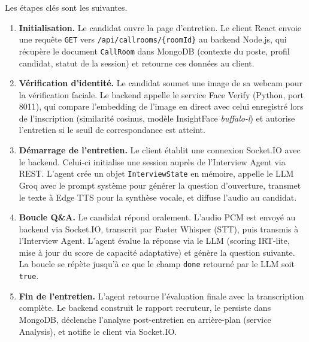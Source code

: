 Les étapes clés sont les suivantes.

\begin{sloppypar}
\begin{enumerate}
  \item \textbf{Initialisation.} Le candidat ouvre la page d'entretien. Le client React envoie
        une requête \texttt{GET} vers \texttt{/api/callrooms/\{roomId\}} au backend Node.js,
        qui récupère le document \texttt{CallRoom} dans MongoDB (contexte du poste, profil
        candidat, statut de la session) et retourne ces données au client.

  \item \textbf{Vérification d'identité.} Le candidat soumet une image de sa webcam pour
        la vérification faciale. Le backend appelle le service Face Verify (Python, port 8011),
        qui compare l'embedding de l'image en direct avec celui enregistré lors de l'inscription
        (similarité cosinus, modèle InsightFace \textit{buffalo-l}) et autorise l'entretien
        si le seuil de correspondance est atteint.

  \item \textbf{Démarrage de l'entretien.} Le client établit une connexion Socket.IO avec le
        backend. Celui-ci initialise une session auprès de l'Interview Agent via REST. L'agent
        crée un objet \texttt{InterviewState} en mémoire, appelle le LLM Groq avec le prompt
        système pour générer la question d'ouverture, transmet le texte à Edge TTS pour la
        synthèse vocale, et diffuse l'audio au candidat.

  \item \textbf{Boucle Q\&A.} Le candidat répond oralement. L'audio PCM est envoyé au backend
        via Socket.IO, transcrit par Faster Whisper (STT), puis transmis à l'Interview Agent.
        L'agent évalue la réponse via le LLM (scoring IRT-lite, mise à jour du score de
        capacité adaptative) et génère la question suivante. La boucle se répète jusqu'à ce
        que le champ \texttt{done} retourné par le LLM soit \texttt{true}.

  \item \textbf{Fin de l'entretien.} L'agent retourne l'évaluation finale avec la transcription
        complète. Le backend construit le rapport recruteur, le persiste dans MongoDB, déclenche
        l'analyse post-entretien en arrière-plan (service Analysis), et notifie le client via
        Socket.IO.
\end{enumerate}
\end{sloppypar}

